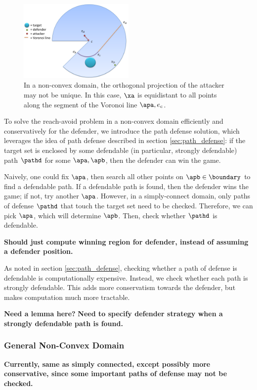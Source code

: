\begin{figure}[h]
\centering
\includegraphics[width=0.5\textwidth]{"fig/non cvx domain 1"}
\caption{In a non-convex domain, the orthogonal projection of the attacker may not be unique. In this case, $\xa$ is equidistant to all points along the segment of the Voronoi line $\apa,e_c$.}
\label{fig:non_uniq_proj}
\end{figure}

To solve the reach-avoid problem in a non-convex domain efficiently and conservatively for the defender, we introduce the path defense solution, which leverages the idea of path defense described in section \ref{sec:path_defense}: if the target set is enclosed by some defendable (in particular, strongly defendable) path $\pathd$ for some $\apa,\apb$, then the defender can win the game. 

Naively, one could fix $\apa$, then search all other points on $\apb\in\boundary$ to find a defendable path. If a defendable path is found, then the defender wins the game; if not, try another $\apa$. However, in a simply-connect domain, only paths of defense $\pathd$ that touch the target set need to be checked. Therefore, we can pick $\apa$, which will determine $\apb$. Then, check whether $\pathd$ is defendable. 

\textbf{Should just compute winning region for defender, instead of assuming a defender position.}

As noted in section \ref{sec:path_defense}, checking whether a path of defense is defendable is computationally expensive. Instead, we check whether each path is strongly defendable. This adds more conservatism towards the defender, but makes computation much more tractable.

\textbf{Need a lemma here?}
\textbf{Need to specify defender strategy when a strongly defendable path is found.}

\subsubsection{General Non-Convex Domain}
\textbf{Currently, same as simply connected, except possibly more conservative, since some important paths of defense may not be checked.}

